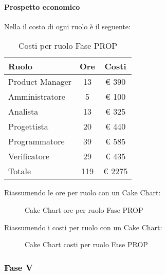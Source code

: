 			\paragraph{Prospetto economico}
				Nella  il costo di ogni ruolo è il seguente:
				\begin{table}
					\begin{center}
						\begin{tabular}{| l | c | c |}
							\hline
							Ruolo 				& Ore 		& Costi  \\ \hline
							
							Product Manager		& 13 		& \euro{} 390 	\\
							Amministratore 		& 5 		& \euro{} 100 	\\
							Analista	 		& 13 		& \euro{} 325 	\\
							Progettista 		& 20 		& \euro{} 440  	\\
							Programmatore		& 39 		& \euro{} 585 	\\
							Verificatore		& 29 		& \euro{} 435 	\\ \hline \hline
							
							Totale	 			& 119 		& \euro{} 2275 	\\ \hline
						\end{tabular}
					\end{center}
					\caption{Costi per ruolo Fase PROP}
				\end{table}
				Riassumendo le ore per ruolo con un Cake Chart:
				\begin{figure}\centering
					\caption{Cake Chart ore per ruolo Fase PROP}
				\end{figure}
				Riassumendo i costi per ruolo con un Cake Chart:
				\begin{figure}\centering
					\caption{Cake Chart costi per ruolo Fase PROP}
				\end{figure}
		\subsubsection{Fase V}
